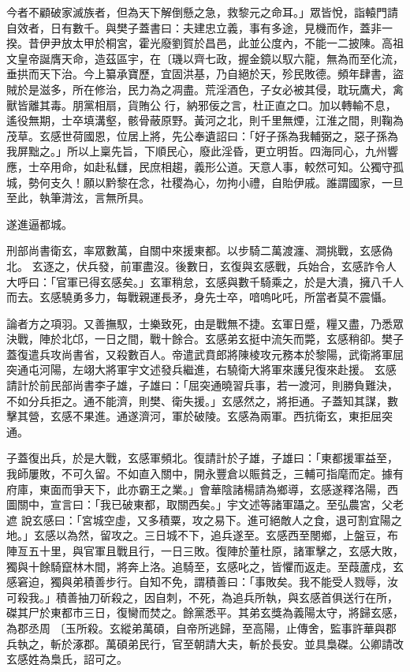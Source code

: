 \begin{pinyinscope}
 今者不顧破家滅族者，但為天下解倒懸之急，救黎元之命耳。」眾皆悅，詣轅門請自效者，日有數千。與樊子蓋書曰：夫建忠立義，事有多途，見機而作，蓋非一揆。昔伊尹放太甲於桐宮，霍光廢劉賀於昌邑，此並公度內，不能一二披陳。高祖文皇帝誕膺天命，造茲區宇，在〔璣以齊七政，握金鏡以馭六龍，無為而至化流，垂拱而天下治。今上纂承寶歷，宜固洪基，乃自絕於天，殄民敗德。頻年肆書，盜賊於是滋多，所在修治，民力為之凋盡。荒淫酒色，子女必被其侵，耽玩鷹犬，禽獸皆離其毒。朋黨相扇，貨賄公
 行，納邪佞之言，杜正直之口。加以轉輸不息，遙役無期，士卒填溝壑，骸骨蔽原野。黃河之北，則千里無煙，江淮之間，則鞠為茂草。玄感世荷國恩，位居上將，先公奉遺詔曰：「好子孫為我輔弼之，惡子孫為我屏黜之。」所以上稟先旨，下順民心，廢此淫昏，更立明哲。四海同心，九州響應，士卒用命，如赴私讎，民庶相趨，義形公道。天意人事，較然可知。公獨守孤城，勢何支久！願以黔黎在念，社稷為心，勿拘小禮，自貽伊戚。誰謂國家，一旦至此，執筆潸泫，言無所具。



 遂進逼都城。



 刑部尚書衛玄，率眾數萬，自關中來援東都。以步騎二萬渡瀍、澗挑戰，玄感偽北。
 玄逐之，伏兵發，前軍盡沒。後數日，玄復與玄感戰，兵始合，玄感詐令人大呼曰：「官軍已得玄感矣。」玄軍稍怠，玄感與數千騎乘之，於是大潰，擁八千人而去。玄感驍勇多力，每戰親運長矛，身先士卒，喑嗚叱吒，所當者莫不震懾。



 論者方之項羽。又善撫馭，士樂致死，由是戰無不捷。玄軍日蹙，糧又盡，乃悉眾決戰，陣於北邙，一日之間，戰十餘合。玄感弟玄挺中流矢而斃，玄感稍卻。樊子蓋復遣兵攻尚書省，又殺數百人。帝遣武賁郎將陳棱攻元務本於黎陽，武衛將軍屈突通屯河陽，左翊大將軍宇文述發兵繼進，右驍衛大將軍來護兒復來赴援。
 玄感請計於前民部尚書李子雄，子雄曰：「屈突通曉習兵事，若一渡河，則勝負難決，不如分兵拒之。通不能濟，則樊、衛失援。」玄感然之，將拒通。子蓋知其謀，數擊其營，玄感不果進。通遂濟河，軍於破陵。玄感為兩軍。西抗衛玄，東拒屈突通。



 子蓋復出兵，於是大戰，玄感軍頻北。復請計於子雄，子雄曰：「東都援軍益至，我師屢敗，不可久留。不如直入關中，開永豐倉以賑貧乏，三輔可指麾而定。據有府庫，東面而爭天下，此亦霸王之業。」會華陰諸楊請為鄉導，玄感遂釋洛陽，西圖關中，宣言曰：「我已破東都，取關西矣。」宇文述等諸軍躡之。至弘農宮，父老遮
 說玄感曰：「宮城空虛，又多積粟，攻之易下。進可絕敵人之食，退可割宜陽之地。」玄感以為然，留攻之。三日城不下，追兵遂至。玄感西至閿鄉，上盤豆，布陣亙五十里，與官軍且戰且行，一日三敗。復陣於董杜原，諸軍擊之，玄感大敗，獨與十餘騎竄林木間，將奔上洛。追騎至，玄感叱之，皆懼而返走。至葭蘆戍，玄感窘迫，獨與弟積善步行。自知不免，謂積善曰：「事敗矣。我不能受人戮辱，汝可殺我。」積善抽刀斫殺之，因自刺，不死，為追兵所執，與玄感首俱送行在所，磔其尸於東都市三日，復臠而焚之。餘黨悉平。其弟玄獎為義陽太守，將歸玄感，為郡丞周
 〔玉所殺。玄縱弟萬碩，自帝所逃歸，至高陽，止傳舍，監事許華與郡兵執之，斬於涿郡。萬碩弟民行，官至朝請大夫，斬於長安。並具梟磔。公卿請改玄感姓為梟氏，詔可之。




\end{pinyinscope}
